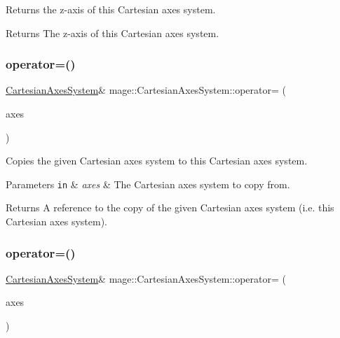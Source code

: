 Returns the z-\/axis of this Cartesian axes system.

\begin{DoxyReturn}{Returns}
The z-\/axis of this Cartesian axes system. 
\end{DoxyReturn}
\hypertarget{structmage_1_1_cartesian_axes_system_af52da9fbab85fc87921eff0ef6a17fe4}{}\label{structmage_1_1_cartesian_axes_system_af52da9fbab85fc87921eff0ef6a17fe4} 
\subsubsection{\texorpdfstring{operator=()}{operator=()}\hspace{0.1cm}{\footnotesize\ttfamily [1/2]}}
{\footnotesize\ttfamily \hyperlink{structmage_1_1_cartesian_axes_system}{Cartesian\+Axes\+System}\& mage\+::\+Cartesian\+Axes\+System\+::operator= (\begin{DoxyParamCaption}\item[{const \hyperlink{structmage_1_1_cartesian_axes_system}{Cartesian\+Axes\+System} \&}]{axes }\end{DoxyParamCaption})\hspace{0.3cm}{\ttfamily [default]}}

Copies the given Cartesian axes system to this Cartesian axes system.


\begin{DoxyParams}[1]{Parameters}
\mbox{\tt in}  & {\em axes} & The Cartesian axes system to copy from. \\
\hline
\end{DoxyParams}
\begin{DoxyReturn}{Returns}
A reference to the copy of the given Cartesian axes system (i.\+e. this Cartesian axes system). 
\end{DoxyReturn}
\hypertarget{structmage_1_1_cartesian_axes_system_ad35384f10ad5a84787ef0cc5507955e9}{}\label{structmage_1_1_cartesian_axes_system_ad35384f10ad5a84787ef0cc5507955e9} 
\subsubsection{\texorpdfstring{operator=()}{operator=()}\hspace{0.1cm}{\footnotesize\ttfamily [2/2]}}
{\footnotesize\ttfamily \hyperlink{structmage_1_1_cartesian_axes_system}{Cartesian\+Axes\+System}\& mage\+::\+Cartesian\+Axes\+System\+::operator= (\begin{DoxyParamCaption}\item[{\hyperlink{structmage_1_1_cartesian_axes_system}{Cartesian\+Axes\+System} \&\&}]{axes }\end{DoxyParamCaption})\hspace{0.3cm}{\ttfamily [default]}}

